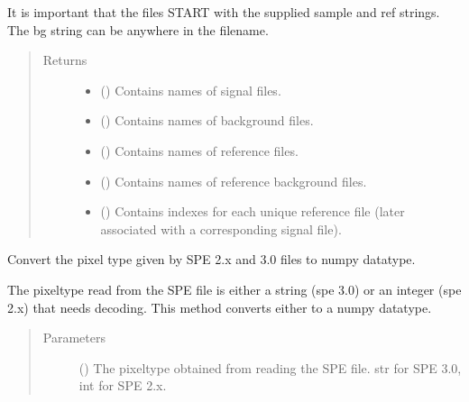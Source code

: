 \documentclass[a4paper,10pt,english]{sphinxmanual}
\begin{document}
\begin{fulllineitems}
\begin{fulllineitems}
\sphinxAtStartPar
It is important that the files START with the supplied sample and ref strings. The bg string can be
anywhere in the filename.
\begin{quote}\begin{description}
\item[{Returns}] \leavevmode
\sphinxAtStartPar
\begin{itemize}
\item {} 
\sphinxAtStartPar
{} () \textendash{} Contains names of signal files.

\item {} 
\sphinxAtStartPar
{} () \textendash{} Contains names of background files.

\item {} 
\sphinxAtStartPar
{} () \textendash{} Contains names of reference files.

\item {} 
\sphinxAtStartPar
{} () \textendash{} Contains names of reference background files.

\item {} 
\sphinxAtStartPar
{} () \textendash{} Contains indexes for each unique reference file (later associated with a corresponding signal
file).

\end{itemize}


\end{description}\end{quote}

\end{fulllineitems}


\begin{fulllineitems}
\label{\detokenize{sfgtools:sfgtools.SFGProcessTools.get_pixel_type}}
\sphinxAtStartPar
Convert the pixel type given by SPE 2.x and 3.0 files to numpy datatype.

\sphinxAtStartPar
The pixeltype read from the SPE file is either a string (spe 3.0) or an integer (spe 2.x) that
needs decoding. This method converts either to a numpy datatype.
\begin{quote}\begin{description}
\item[{Parameters}] \leavevmode
\sphinxAtStartPar
{} () \textendash{} The pixeltype obtained from reading the SPE file. str for SPE 3.0, int for SPE 2.x.


\end{description}
\end{quote}
\end{fulllineitems}
\end{fulllineitems}
\end{document}
